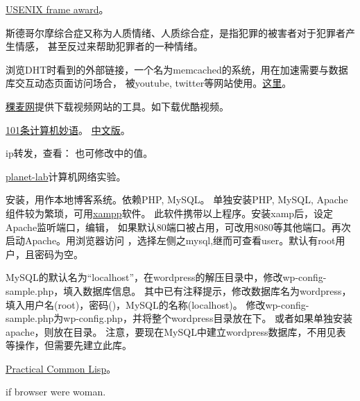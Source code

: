 \href{http://www.usenix.org/about/flame.html}{USENIX frame award}。

斯德哥尔摩综合症又称为人质情绪、人质综合症，是指犯罪的被害者对于犯罪者产生情感，
甚至反过来帮助犯罪者的一种情绪。

浏览DHT时看到的外部链接，一个名为memcached的系统，用在加速需要与数据库交互动态页面访问场合，
被youtube, twitter等网站使用。\href{http://www.danga.com/memcached/}{这里}。

\href{http://www.xmlbar.com/}{稞麦网}提供下载视频网站的工具。如下载优酷视频。

\href{http://www.devtopics.com/101-great-computer-programming-quotes/}{101条计算机妙语}。
\href{http://news.csdn.net/a/20090522/211469.html}{中文版}。

ip转发，查看：
也可修改中的值。

\href{http://www.planet-lab.org/}{planet-lab}计算机网络实验。

安装，用作本地博客系统。依赖PHP, MySQL。
单独安装PHP, MySQL, Apache组件较为繁琐，可用\href{http://www.apachefriends.org/en/xampp.html}{xampp}软件。
此软件携带以上程序。安装xamp后，设定Apache监听端口，编辑，
如果默认80端口被占用，可改用8080等其他端口。再次启动Apache。用浏览器访问
，选择左侧之mysql,继而可查看user。默认有root用户，且密码为空。

MySQL的默认名为“localhost”，在wordpress的解压目录中，修改wp-config-sample.php，填入数据库信息。
其中已有注释提示，修改数据库名为wordpress，填入用户名(root)，密码()，MySQL的名称(localhost)。
修改wp-config-sample.php为wp-config.php，并将整个wordpress目录放在下。
或者如果单独安装apache，则放在目录。
注意，要现在MySQL中建立wordpress数据库，不用见表等操作，但需要先建立此库。

\href{http://gigamonkeys.com/book/}{Practical Common Lisp}。



if browser were woman.


